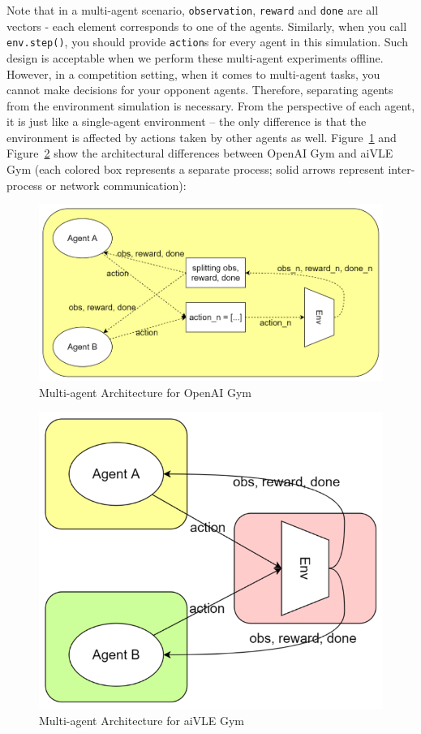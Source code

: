 Note that in a multi-agent scenario, \texttt{observation}, \texttt{reward} and \texttt{done} are all vectors - each element corresponds to one of the agents. Similarly, when you call \texttt{env.step()}, you should provide \texttt{action}s for every agent in this simulation. Such design is acceptable when we perform these multi-agent experiments offline. However, in a competition setting, when it comes to multi-agent tasks, you cannot make decisions for your opponent agents. Therefore, separating agents from the environment simulation is necessary. From the perspective of each agent, it is just like a single-agent environment – the only difference is that the environment is affected by actions taken by other agents as well. Figure~\ref{fig:opanai-gym-multi-arch} and Figure~\ref{fig:aivle-gym-multi-arch} show the architectural differences between OpenAI Gym and aiVLE Gym (each colored box represents a separate process; solid arrows represent inter-process or network communication):
\begin{figure}[H]
    \centering
    \includegraphics{images/opanai-gym-multi-arch.png}
    \caption{Multi-agent Architecture for OpenAI Gym}
    \label{fig:opanai-gym-multi-arch}
\end{figure}
\begin{figure}[H]
    \centering
    \includegraphics{images/aivle-gym-multi-arch.png}
    \caption{Multi-agent Architecture for aiVLE Gym}
    \label{fig:aivle-gym-multi-arch}
\end{figure}

